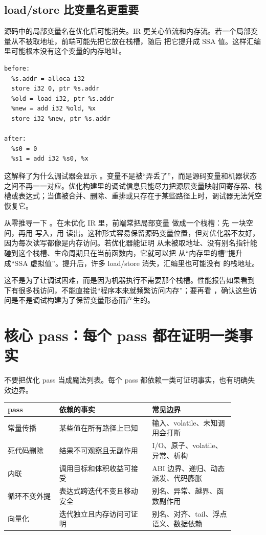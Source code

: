 \subsection{load/store 比变量名更重要}

源码中的局部变量名在优化后可能消失。IR 更关心值流和内存流。若一个局部变量从不被取地址，前端可能先把它放在栈槽，随后  把它提升成 SSA 值。这样汇编里可能根本没有这个变量的内存地址。

\begin{lstlisting}[numbers=none,caption={mem2reg 前后的思路}]
before:
  %s.addr = alloca i32
  store i32 0, ptr %s.addr
  %old = load i32, ptr %s.addr
  %new = add i32 %old, %x
  store i32 %new, ptr %s.addr

after:
  %s0 = 0
  %s1 = add i32 %s0, %x
\end{lstlisting}

这解释了为什么调试器会显示 。变量不是被“弄丢了”，而是源码变量和机器状态之间不再一一对应。优化构建里的调试信息只能尽力把源层变量映射回寄存器、栈槽或表达式；当值被合并、删除、重排或只存在于某些路径上时，调试器无法凭空恢复它。

从零推导一下 。在未优化 IR 里，前端常把局部变量  做成一个栈槽：先  一块空间，再用  写入，用  读出。这种形式容易保留源码变量位置，但对优化器不友好，因为每次读写都像是内存访问。若优化器能证明  从未被取地址、没有别名指针能碰到这个栈槽、生命周期只在当前函数内，它就可以把  从“内存里的槽”提升成“SSA 虚拟值”。提升后，许多 load/store 消失，汇编里也可能没有  的栈地址。

这不是为了让调试困难，而是因为机器执行不需要那个栈槽。性能报告如果看到  下有很多栈访问，不能直接说“程序本来就频繁访问内存”；要再看 ，确认这些访问是不是调试构建为了保留变量形态而产生的。

\section{核心 pass：每个 pass 都在证明一类事实}

不要把优化 pass 当成魔法列表。每个 pass 都依赖一类可证明事实，也有明确失效边界。

\begin{center}
\small
\begin{tabular}{p{0.20\linewidth}p{0.36\linewidth}p{0.32\linewidth}}
\toprule
pass & 依赖的事实 & 常见边界 \\
\midrule
常量传播 & 某些值在所有路径上已知 & 输入、volatile、未知调用会打断 \\
死代码删除 & 结果不可观察且无副作用 & I/O、原子、volatile、异常、析构 \\
内联 & 调用目标和体积收益可接受 & ABI 边界、递归、动态派发、代码膨胀 \\
循环不变外提 & 表达式跨迭代不变且移动安全 & 别名、异常、越界、函数副作用 \\
向量化 & 迭代独立且内存访问可证明 & 别名、对齐、tail、浮点语义、数据依赖 \\
\bottomrule
\end{tabular}
\end{center}

